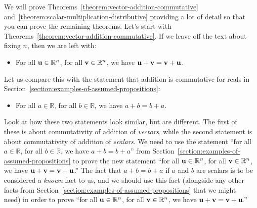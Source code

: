 \documentclass{book}
\theoremstyle{ekimcustom}
\begin{document}
We will prove Theorems~\ref{theorem:vector-addition-commutative} and~\ref{theorem:scalar-multiplication-distributive} providing a lot of detail so that you can prove the remaining theorems. Let's start with Theorems~\ref{theorem:vector-addition-commutative}. If we leave off the text about fixing $n$, then we are left with:
\begin{itemize}
\item For all ${\bf u} \in \mathbb{R}^n$, for all ${\bf v} \in \mathbb{R}^n$, we have ${\bf u}+{\bf v} = {\bf v} + {\bf u}$.
\end{itemize}
Let us compare this with the statement that addition is commutative for reals in Section~\ref{section:examples-of-assumed-propositions}:
\begin{itemize}
\item For all $a \in \mathbb{R}$, for all $b \in \mathbb{R}$, we have $a+b=b+a$.
\end{itemize}
Look at how these two statements look similar, but are different. The first of these is about commutativity of addition of \emph{vectors}, while the second statement is about commutativity of addition of \emph{scalars}. We need to use the statement ``for all $a \in \mathbb{R}$, for all $b \in \mathbb{R}$, we have $a+b=b+a$'' from Section~\ref{section:examples-of-assumed-propositions} to prove the new statement ``for all ${\bf u} \in \mathbb{R}^n$, for all ${\bf v} \in \mathbb{R}^n$, we have ${\bf u}+{\bf v} = {\bf v} + {\bf u}$.'' The fact that $a+b=b+a$ if $a$ and $b$ are scalars is to be considered a \emph{known} fact to us, and we should use this fact (alongside any other facts from Section~\ref{section:examples-of-assumed-propositions} that we might need) in order to prove ``for all ${\bf u} \in \mathbb{R}^n$, for all ${\bf v} \in \mathbb{R}^n$, we have ${\bf u}+{\bf v} = {\bf v} + {\bf u}$.''
\end{document}
